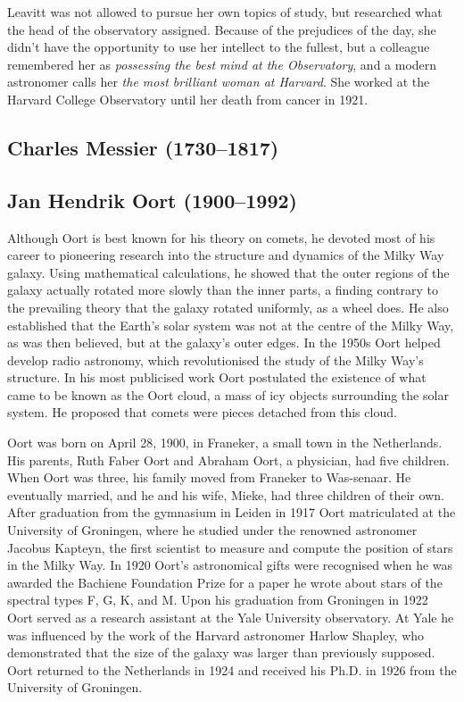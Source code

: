 Leavitt was not allowed to pursue her own topics of study, but researched what the head of the observatory assigned. Because of the prejudices of the day, she didn't have the opportunity to use her intellect to the fullest, but a colleague remembered her as \textit{possessing the best mind at the Observatory}, and a modern astronomer calls her \textit{the most brilliant woman at Harvard}. She worked at the Harvard College Observatory until her death from cancer in 1921.

\subsection[Charles \scshape{Messier}]{Charles Messier (1730--1817)}\label{bio:messier}

\subsection[Jan \scshape{Oort}]{Jan Hendrik Oort (1900--1992)}\label{bio:oort}
Although Oort is best known for his theory on comets, he devoted most of his career to pioneering research into the structure and dynamics of the Milky Way galaxy. Using mathematical calculations, he showed that the outer regions of the galaxy actually rotated more slowly than the inner parts, a finding contrary to the prevailing theory that the galaxy rotated uniformly, as a wheel does. He also established that the Earth's solar system was not at the centre of the Milky Way, as was then believed, but at the galaxy's outer edges. In the 1950s Oort helped develop radio astronomy, which revolutionised the study of the Milky Way's structure. In his most publicised work Oort postulated the existence of what came to be known as the Oort cloud, a mass of icy objects surrounding the solar system. He proposed that comets were pieces detached from this cloud.

Oort was born on April 28, 1900, in Franeker, a small town in the Netherlands. His parents, Ruth Faber Oort and Abraham Oort, a physician, had five children. When Oort was three, his family moved from Franeker to Was-senaar. He eventually married, and he and his wife, Mieke, had three children of their own.
After graduation from the gymnasium in Leiden in 1917 Oort matriculated at the University of Groningen, where he studied under the renowned astronomer Jacobus Kapteyn, the first scientist to measure and compute the position of stars in the Milky Way. In 1920 Oort's astronomical gifts were recognised when he was awarded the Bachiene Foundation Prize for a paper he wrote about stars of the spectral types F, G, K, and M. Upon his graduation from Groningen in 1922 Oort served as a research assistant at the Yale University observatory. At Yale he was influenced by the work of the Harvard astronomer Harlow Shapley, who demonstrated that the size of the galaxy was larger than previously supposed. Oort returned to the Netherlands in 1924 and received his Ph.D. in 1926 from the University of Groningen.

